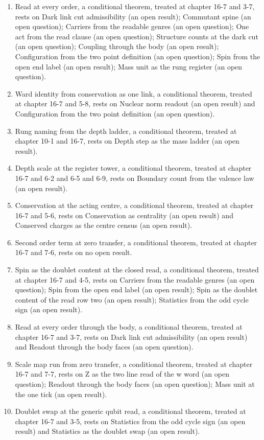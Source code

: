 \begin{enumerate}
\item Read at every order, a conditional theorem, treated at chapter 16-7 and 3-7, rests on Dark link cut admissibility (an open result); Commutant spine (an open question); Carriers from the readable genres (an open question); One act from the read clause (an open question); Structure counts at the dark cut (an open question); Coupling through the body (an open result); Configuration from the two point definition (an open question); Spin from the open end label (an open result); Mass unit as the rung register (an open question).
\item Ward identity from conservation as one link, a conditional theorem, treated at chapter 16-7 and 5-8, rests on Nuclear norm readout (an open result) and Configuration from the two point definition (an open question).
\item Rung naming from the depth ladder, a conditional theorem, treated at chapter 10-1 and 16-7, rests on Depth step as the mass ladder (an open result).
\item Depth scale at the register tower, a conditional theorem, treated at chapter 16-7 and 6-2 and 6-5 and 6-9, rests on Boundary count from the valence law (an open result).
\item Conservation at the acting centre, a conditional theorem, treated at chapter 16-7 and 5-6, rests on Conservation as centrality (an open result) and Conserved charges as the centre census (an open result).
\item Second order term at zero transfer, a conditional theorem, treated at chapter 16-7 and 7-6, rests on no open result.
\item Spin as the doublet content at the closed read, a conditional theorem, treated at chapter 16-7 and 4-5, rests on Carriers from the readable genres (an open question); Spin from the open end label (an open result); Spin as the doublet content of the read row two (an open result); Statistics from the odd cycle sign (an open result).
\item Read at every order through the body, a conditional theorem, treated at chapter 16-7 and 3-7, rests on Dark link cut admissibility (an open result) and Readout through the body faces (an open question).
\item Scale map run from zero transfer, a conditional theorem, treated at chapter 16-7 and 7-7, rests on Z as the two line read of the w word (an open question); Readout through the body faces (an open question); Mass unit at the one tick (an open result).
\item Doublet swap at the generic qubit read, a conditional theorem, treated at chapter 16-7 and 3-5, rests on Statistics from the odd cycle sign (an open result) and Statistics as the doublet swap (an open result).

\end{enumerate}
